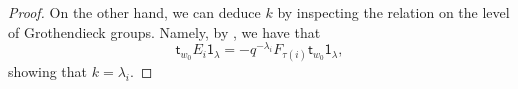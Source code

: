 \documentclass[11pt,reqno]{amsart}
\numberwithin{equation}{section}
\theoremstyle{definition}
\theoremstyle{named}
\newcommand{\st}{\mathsf{t}}
\newcommand{\bone}{\mathbbm{1}}
\newcommand{\sone}{\mathsf{1}}
\begin{document}
\begin{proof}
On the other hand, we can deduce $k$ by inspecting the relation on the level of Grothendieck groups.  Namely, by \cite[Lemma 5.4]{KT}, we have that 
$$
\st_{w_0}E_i\sone_\lambda = -q^{-\lambda_i}F_{\tau(i)}\st_{w_0}\sone_\lambda,
$$
showing that $k=\lambda_i$.
\end{proof}

%
\end{document}
